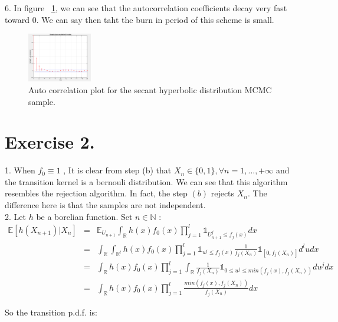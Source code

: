 \documentclass[paper=a4, fontsize=11pt]{scrartcl} %
\numberwithin{equation}{section} %
\numberwithin{figure}{section} %
\numberwithin{table}{section} %
\begin{document}
	6. In figure ~\ref{fig:autocorr}, we can see that the autocorrelation coefficients decay very fast toward $0$. We can say then taht the burn in period of this scheme is small.
	\begin{figure}
		\centering
		\includegraphics[width=0.25\textwidth]{autocorr}
		\caption{\label{fig:autocorr}Auto correlation plot for the secant hyperbolic distribution MCMC sample.}
	\end{figure}
	
	
	\section{Exercise 2.}
	
	1. When $f_0 \equiv 1$ , It is clear from step (b) that $X_n \in \{0,1\}, \forall n=1,\dots,+\infty$ and the transition kernel is a bernouli distribution.  We can see that this algorithm resembles the rejection algorithm. In fact, the step $(b)$ rejects $X_n$. The difference here is that the samples are not independent. \\
		
	2. Let $h$ be a borelian function. Set $n \in \mathbb{N}$ :
	\begin{eqnarray*}
		\mathbb{E}[h(X_{n+1} )|X_n ]&=&\mathbb{E}_{U_{n+1}}\int_{\mathbb{R}}h(x) f_0(x) \prod_{j=1}^{l}\mathbb{1}_{U_{n+1}^j \leq f_j(x)} dx\\
											&=& \int_{\mathbb{R}} \int_{\mathbb{R}^l}h(x) f_0(x) \prod_{j=1}^{l}\mathbb{1}_{u^j \leq f_j(x)} \frac{1}{f_j(X_n)} \mathbb{1}_{[0,f_j(X_n)]} d^lu dx\\
											&=& \int_{\mathbb{R}} h(x) f_0(x) \prod_{j=1}^{l} \int_{\mathbb{R}} \frac{1}{f_j(X_n)} \mathbb{1}_{0\leq u^j \leq min(f_j(x),f_j(X_n))} du^j  dx\\
											&=& \int_{\mathbb{R}} h(x) f_0(x) \prod_{j=1}^{l} \frac{min(f_j(x),f_j(X_n))}{f_j(X_n)} dx
	\end{eqnarray*}
	
	So the transition p.d.f. is:
	
\end{document}
